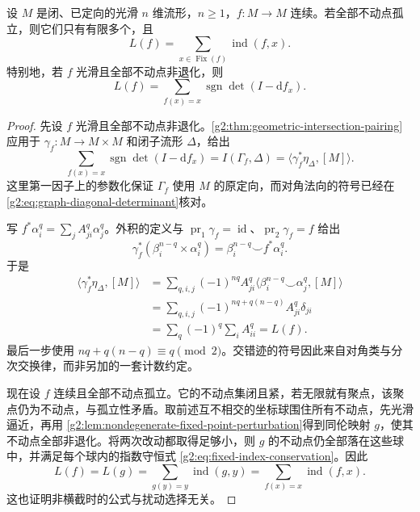 \begin{theorem}[Lefschetz 公式]\label{g2:thm:lefschetz-formula}
	设 \(M\) 是闭、已定向的光滑 \(n\) 维流形，\(n\geq1\)，\(f:M\to M\) 连续。若全部不动点孤立，则它们只有有限多个，且
	\[
		L(f)=\sum_{x\in\operatorname{Fix}(f)}\operatorname{ind}(f,x).
	\]
	特别地，若 \(f\) 光滑且全部不动点非退化，则
	\begin{equation}\label{g2:eq:lefschetz-nondegenerate-formula}
		L(f)=\sum_{f(x)=x}\operatorname{sgn}\det(I-\mathrm{d}f_x).
	\end{equation}
\end{theorem}
\begin{proof}
	先设 \(f\) 光滑且全部不动点非退化。\cref{g2:thm:geometric-intersection-pairing}应用于 \(\gamma_f:M\to M\times M\) 和闭子流形 \(\Delta\)，给出
	\[
		\sum_{f(x)=x}\operatorname{sgn}\det(I-\mathrm{d}f_x)
		=I(\Gamma_f,\Delta)
		=\langle\gamma_f^*\eta_\Delta,[M]\rangle.
	\]
	这里第一因子上的参数化保证 \(\Gamma_f\) 使用 \(M\) 的原定向，而对角法向的符号已经在 \eqref{g2:eq:graph-diagonal-determinant}核对。

	写 \(f^*\alpha_i^q=\sum_j A^q_{ji}\alpha_j^q\)。外积的定义与 \(\operatorname{pr}_1\gamma_f=\operatorname{id}\)、\(\operatorname{pr}_2\gamma_f=f\) 给出
	\[
		\gamma_f^*(\beta_i^{n-q}\times\alpha_i^q)
		=\beta_i^{n-q}\smile f^*\alpha_i^q.
	\]
	于是
	\begin{align*}
		\langle\gamma_f^*\eta_\Delta,[M]\rangle
		&=\sum_{q,i,j}(-1)^{nq}A^q_{ji}
			\langle\beta_i^{n-q}\smile\alpha_j^q,[M]\rangle\\
		&=\sum_{q,i,j}(-1)^{nq+q(n-q)}A^q_{ji}\delta_{ji}\\
		&=\sum_q(-1)^q\sum_i A^q_{ii}=L(f).
	\end{align*}
	最后一步使用 \(nq+q(n-q)\equiv q\pmod2\)。交错迹的符号因此来自对角类与分次交换律，而非另加的一套计数约定。

	现在设 \(f\) 连续且全部不动点孤立。它的不动点集闭且紧，若无限就有聚点，该聚点仍为不动点，与孤立性矛盾。取前述互不相交的坐标球围住所有不动点，先光滑逼近，再用 \cref{g2:lem:nondegenerate-fixed-point-perturbation}得到同伦映射 \(g\)，使其不动点全部非退化。将两次改动都取得足够小，则 \(g\) 的不动点仍全部落在这些球中，并满足每个球内的指数守恒式 \eqref{g2:eq:fixed-index-conservation}。因此
	\[
		L(f)=L(g)=\sum_{g(y)=y}\operatorname{ind}(g,y)
		=\sum_{f(x)=x}\operatorname{ind}(f,x).
	\]
	这也证明非横截时的公式与扰动选择无关。
\end{proof}

